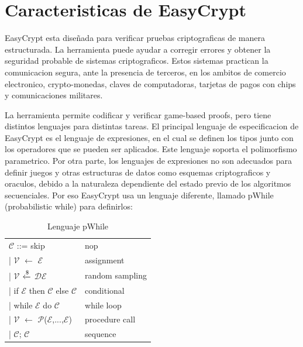 \documentclass[runningheads]{llncs}
\begin{document}
\section{Caracteristicas de EasyCrypt}

EasyCrypt esta diseñada para verificar pruebas criptograficas de manera estructurada. La herramienta puede ayudar a corregir errores y obtener la seguridad probable de sistemas criptograficos. Estos sistemas practican la comunicacion segura, ante la presencia de terceros, en los ambitos de comercio electronico, crypto-monedas, claves de computadoras, tarjetas de pagos con chips y comunicaciones militares. 

La herramienta permite codificar y verificar game-based proofs, pero tiene distintos lenguajes para distintas tareas. El principal lenguaje de especificacion de EasyCrypt es el lenguaje de expresiones, en el cual se definen los tipos junto con los operadores que se pueden ser aplicados. Este lenguaje soporta el polimorfismo parametrico. Por otra parte, los lenguajes de expresiones no son adecuados para definir juegos y otras estructuras de datos como esquemas criptograficos y oraculos, debido a la naturaleza dependiente del estado previo de los algoritmos secuenciales. Por eso EasyCrypt usa un lenguaje diferente, llamado pWhile\cite{ref_book1} (probabilistic while) para definirlos:

\begin{table}[H]
  \setlength{\tabcolsep}{12pt}
  \caption{Lenguaje pWhile}
  \label{tab:simple}
  \centering
  \begin{tabular}{ll}
    \toprule
    $\mathcal{C}$ ::= skip & nop\\
    \hspace{0.5cm}| $\mathcal{V}$	$\xleftarrow{}$ $\mathcal{E}$ & assignment\\
    \hspace{0.5cm}| $\mathcal{V}$ $\xleftarrow{\text{\textdollar}}$ $\mathcal{D}$$\mathcal{E}$ & random sampling\\
    \hspace{0.5cm}| if $\mathcal{E}$ then $\mathcal{C}$ else $\mathcal{C}$ & conditional\\
    \hspace{0.5cm}| while $\mathcal{E}$ do $\mathcal{C}$ & while loop\\
    \hspace{0.5cm}| $\mathcal{V}$	$\xleftarrow{}$ $\mathcal{P}$($\mathcal{E}$,...,$\mathcal{E}$) & procedure call\\
    \hspace{0.5cm}| $\mathcal{C}$; $\mathcal{C}$ & sequence\\
    \bottomrule
  \end{tabular}
\end{table}
\end{document}
